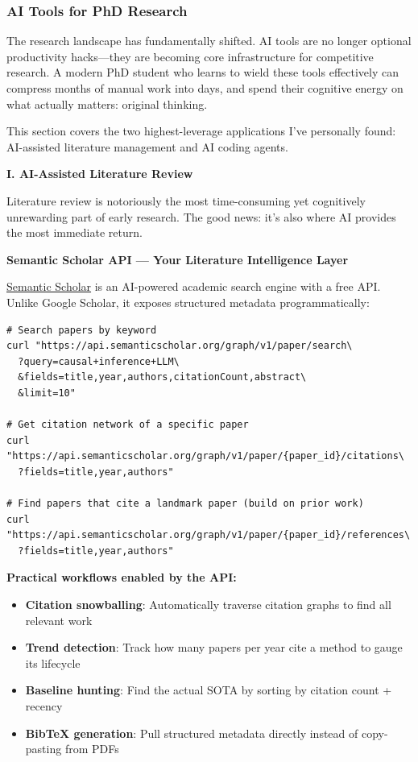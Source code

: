 \documentclass[11pt,a4paper]{article}
\begin{document}
\subsubsection{AI Tools for PhD Research}

\begin{tcolorbox}[colback=blue!5,colframe=darkblue,title={The AI-Augmented Researcher}]
The research landscape has fundamentally shifted. AI tools are no longer optional productivity hacks---they are becoming core infrastructure for competitive research. A modern PhD student who learns to wield these tools effectively can compress months of manual work into days, and spend their cognitive energy on what actually matters: original thinking.

This section covers the two highest-leverage applications I've personally found: AI-assisted literature management and AI coding agents.
\end{tcolorbox}

\textbf{I. AI-Assisted Literature Review}

Literature review is notoriously the most time-consuming yet cognitively unrewarding part of early research. The good news: it's also where AI provides the most immediate return.

\textbf{Semantic Scholar API --- Your Literature Intelligence Layer}

\href{https://api.semanticscholar.org/}{Semantic Scholar} is an AI-powered academic search engine with a free API. Unlike Google Scholar, it exposes structured metadata programmatically:

\begin{lstlisting}[style=bashstyle]
# Search papers by keyword
curl "https://api.semanticscholar.org/graph/v1/paper/search\
  ?query=causal+inference+LLM\
  &fields=title,year,authors,citationCount,abstract\
  &limit=10"

# Get citation network of a specific paper
curl "https://api.semanticscholar.org/graph/v1/paper/{paper_id}/citations\
  ?fields=title,year,authors"

# Find papers that cite a landmark paper (build on prior work)
curl "https://api.semanticscholar.org/graph/v1/paper/{paper_id}/references\
  ?fields=title,year,authors"
\end{lstlisting}

\textbf{Practical workflows enabled by the API:}
\begin{itemize}
    \item \textbf{Citation snowballing}: Automatically traverse citation graphs to find all relevant work
    \item \textbf{Trend detection}: Track how many papers per year cite a method to gauge its lifecycle
    \item \textbf{Baseline hunting}: Find the actual SOTA by sorting by citation count + recency
    \item \textbf{BibTeX generation}: Pull structured metadata directly instead of copy-pasting from PDFs
\end{itemize}
\end{document}
